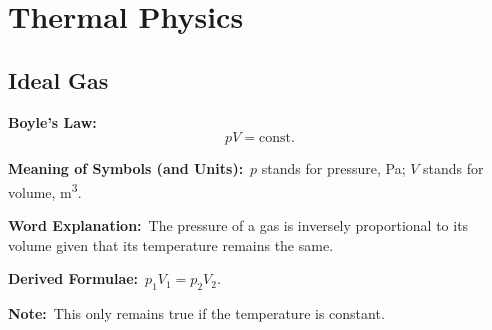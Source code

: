 \documentclass[8pt]{article}
\newcommand{\MeanSymb}{\textbf{Meaning of Symbols (and Units):}\ }
\newcommand{\WordExpl}{\textbf{Word Explanation:}\ }
\newcommand{\DeriForm}{\textbf{Derived Formulae:}\ }
\newcommand{\Note}{\textbf{Note:}\ }
\begin{document}
    \section{Thermal Physics}
        \subsection{Ideal Gas}
            \textbf{Boyle's Law:}
            \[
                pV = \mathrm{const.}
            \]

            \MeanSymb \(p\) stands for pressure, \unit{\pascal}; \(V\) stands for volume, \unit{\metre \cubed}.

            \WordExpl The pressure of a gas is inversely proportional to its volume given that its temperature remains the same.

            \DeriForm \(p_1 V_1 = p_2 V_2\).

            \Note This only remains true if the temperature is constant.
\end{document}
